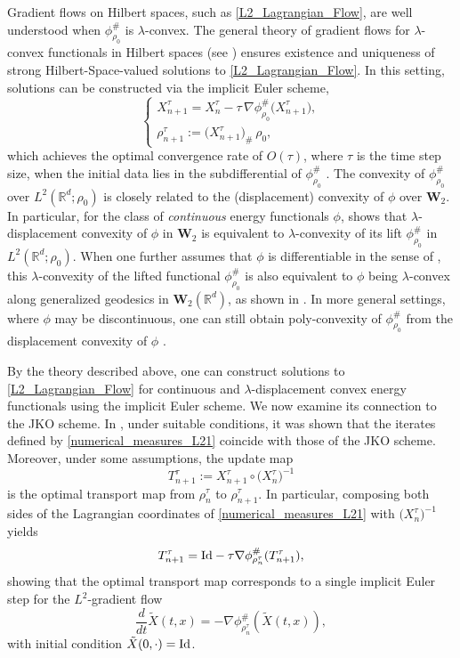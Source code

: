 \documentclass[11pt,a4paper]{amsart}
\newcommand{\1}{\mathds{1}}
\newcommand{\R}{{\mathbb R}}
\numberwithin{equation}{section}
\begin{document}
Gradient flows on Hilbert spaces, such as \eqref{L2_Lagrangian_Flow}, are well understood when $\phi^{\#}_{\rho_0}$ is $\lambda$-convex. The general theory of gradient flows for $\lambda$-convex functionals in Hilbert spaces (see \cite[Chapters 11 and 12]{ambrosio2021lectures}) ensures existence and uniqueness of strong Hilbert-Space-valued  solutions to \eqref{L2_Lagrangian_Flow}. In this setting, solutions can be constructed via the implicit Euler scheme,
\begin{equation}
\begin{cases}
X^{\tau}_{n+1} = X^{\tau}_n - \tau \,\nabla \phi^{\#}_{\rho_0}\bigl(X^{\tau}_{n+1}\bigr),  \\
\rho^{\tau}_{n+1} := \bigl(X^{\tau}_{n+1}\bigr)_{\#}\,\rho_0, \label{numerical_measures_L21}
\end{cases}
\end{equation}
which achieves the optimal convergence rate of $O(\tau)$, where $\tau$ is the time step size, when the initial data lies in the subdifferential of $\phi^{\#}_{\rho_0}$ \cite{ambrosio2005gradient}.
The convexity of $\phi^{\#}_{\rho_0}$ over $L^2(\R^d;\rho_0)$ is closely related to the (displacement) convexity of $\phi$ over $\mathbf{W}_2$. In particular, for the class of \textit{continuous} energy functionals $\phi$, \cite[Lemma 3.6]{gangbo2022global} shows that $\lambda$-displacement convexity of $\phi$ in $\mathbf{W}_2$ is equivalent to $\lambda$-convexity of its lift $\phi^{\#}_{\rho_0}$ in $L^2(\R^d;\rho_0)$. When one further assumes that $\phi$ is differentiable in the sense of \cite{gangbo2019differentiability}, 
this $\lambda$-convexity of the lifted functional $\phi^{\#}_{\rho_0}$ is also equivalent to 
$\phi$ being $\lambda$-convex along generalized geodesics in $\mathbf{W}_2(\R^d)$, as shown in \cite[Theorem 1.1]{parker2024some}. In more general settings, where $\phi$ may be discontinuous, one can still obtain poly-convexity of $\phi^{\#}_{\rho_0}$ from the displacement convexity of $\phi$ \cite{carrillo2021lagrangian}. 


By the theory described above, one can construct solutions to \eqref{L2_Lagrangian_Flow} for continuous and $\lambda$-displacement convex energy functionals using the implicit Euler scheme. We now examine its connection to the JKO scheme. In \cite{ambrosio2006stability}, under suitable conditions, it was shown that the iterates defined by \eqref{numerical_measures_L21} coincide with those of the JKO scheme. Moreover, under some assumptions, the update map
\[
T^{\tau}_{n+1} := X^{\tau}_{n+1} \circ \bigl(X^{\tau}_n\bigr)^{-1}
\]
is the optimal transport map from $\rho^{\tau}_n$ to $\rho^{\tau}_{n+1}$. In particular, composing both sides of the Lagrangian coordinates of \eqref{numerical_measures_L21} with $\bigl(X^{\tau}_n\bigr)^{-1}$ yields
\[
T^{\tau}_{n+1} = \textnormal{Id} - \tau \nabla \phi^{\#}_{\rho^{\tau}_n}(T^{\tau}_{n+1}),
\]
showing that the optimal transport map corresponds to a single implicit Euler step for the $L^2$-gradient flow
\[
\frac{d}{dt} \tilde{X}(t,x) = -\nabla \phi^{\#}_{\rho^{\tau}_n}(\tilde{X}(t,x)),
\]
with initial condition $\tilde{X}(0,\cdot) = \textnormal{Id}$. 
\end{document}
